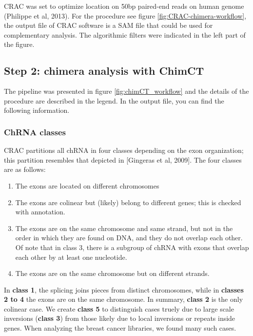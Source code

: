 \documentclass[a4paper]{article}
\begin{document}
CRAC was set to optimize location on 50bp paired-end reads on human genome (Philippe 
et al, 2013). For the procedure see figure \ref{fig:CRAC-chimera-workflow}, the output file of
CRAC software is a SAM file that could be used for complementary analysis. The algorithmic 
filters were indicated in the left part of the figure.

\subsection{Step 2: chimera analysis with ChimCT}

The pipeline was presented in figure \ref{fig:chimCT_workflow} and the details of the procedure are described in the
legend. In the output file, you can find the following information. 

\subsubsection{ChRNA classes}

CRAC partitions all chRNA in four classes depending on the exon organization; this partition 
resembles that depicted in [Gingeras et al, 2009]. The four classes are as follows:

\begin{enumerate}

\item The exons are located on different chromosomes

\item The exons are colinear but (likely) belong to different genes; this is checked with 
annotation.

\item The exons are on the same chromosome and same strand, but not in the order in which 
they are found on DNA, and they do not overlap each other. Of note that in class 3, there is a 
subgroup of chRNA with exons that overlap each other by at least one nucleotide.

\item The exons are on the same chromosome but on different strands.

\end{enumerate}

In \textbf{class 1}, the splicing joins pieces from distinct chromosomes, while in \textbf{classes 2 to 4} the 
exons are on the same chromosome. In summary, \textbf{class 2} is the only colinear case.
We create \textbf{class 5} to distinguish cases truely due to large scale inversions (\textbf{class 3}) from those 
likely due to local inversions or repeats inside genes. When analyzing the breast cancer 
libraries, we found many such cases.
\end{document}
